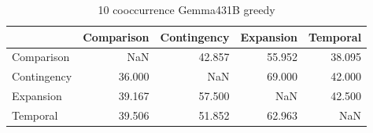 \begin{table}
\caption{10 cooccurrence Gemma431B greedy}
\begin{tabular}{lrrrr}
\toprule
 & Comparison & Contingency & Expansion & Temporal \\
\midrule
Comparison & NaN & 42.857 & 55.952 & 38.095 \\
Contingency & 36.000 & NaN & 69.000 & 42.000 \\
Expansion & 39.167 & 57.500 & NaN & 42.500 \\
Temporal & 39.506 & 51.852 & 62.963 & NaN \\
\bottomrule
\end{tabular}
\end{table}
